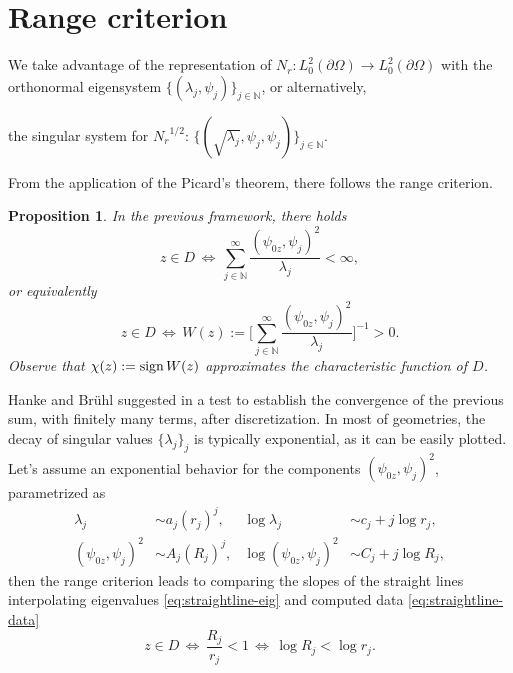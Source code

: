 \documentclass[10pt, a4paper, twoside, openright]{book}
\theoremstyle{definition}
\theoremstyle{plain}
\theoremstyle{plain}
\theoremstyle{plain}
\newtheorem{proposition}[subsection]{Proposition}
\theoremstyle{plain}
\theoremstyle{plain}
\theoremstyle{plain}
\theoremstyle{plain}
\theoremstyle{plain}
\begin{document}
\section{Range criterion}
\label{section:range-criterion}
We take advantage of the representation of ${N_r}:L^2_0(\partial \Omega)\to L^2_0(\partial \Omega)$ with the orthonormal eigensystem $\bigl\{(\lambda_j, \psi_j)\bigr\}_{j\in\mathbb{N}}$, or alternatively,
\begin{center}
the singular system for ${N_r}^{1/2}$: $\bigl\{(\sqrt{\lambda_j}, \psi_j, \psi_j)\bigr\}_{j\in\mathbb{N}}$.
\end{center}
From the application of the Picard's theorem, there follows the range criterion.
\begin{proposition}
 In the previous framework, there holds
 \begin{equation}
  z \in D \, \Longleftrightarrow \, \sum_{j \in \mathbb{N}}^{\infty}\frac{(\psi_{0z}, \psi_j)^2}{\lambda_j} < \infty,
 \end{equation}
 or equivalently
 \begin{equation}
  z \in D \, \Longleftrightarrow \, W(z):=\Bigg[\sum_{j \in \mathbb{N}}^{\infty}\frac{(\psi_{0z}, \psi_j)^2}{\lambda_j}\Bigg]^{-1} > 0.
 \end{equation}
Observe that $\chi(z):=\textup{sign}\,W(z)$ approximates the characteristic function of $D$.
\end{proposition}
Hanke and Br\"{u}hl suggested in \cite{hanke-bruhl:recent} a test to establish the convergence of the previous sum, with finitely many terms, after discretization. In most of geometries, the decay of singular values $\bigl\{\lambda_j\bigr\}_j$ is typically exponential, as it can be easily plotted. 
Let's assume an exponential behavior for the components $(\psi_{0z},\psi_j )^2$, parametrized as
\begin{align}
 \lambda_j &\sim a_j (r_j) ^j,  & \log\lambda_j &\sim c_j + j\log r_j,\label{eq:straightline-eig}\\
 (\psi_{0z}, \psi_j)^2 &\sim A_j(R_j)^j, & \log(\psi_{0z}, \psi_j)^2 &\sim C_j + j\log R_j\label{eq:straightline-data},
\end{align}
then the range criterion leads to comparing the slopes of the straight lines interpolating 
eigenvalues \eqref{eq:straightline-eig} and computed data \eqref{eq:straightline-data}
\begin{equation}
 z\in D \,\Longleftrightarrow\, \dfrac{R_j}{r_j} < 1 \,\Longleftrightarrow\, \log R_j < \log r_j.
\end{equation}
\end{document}
